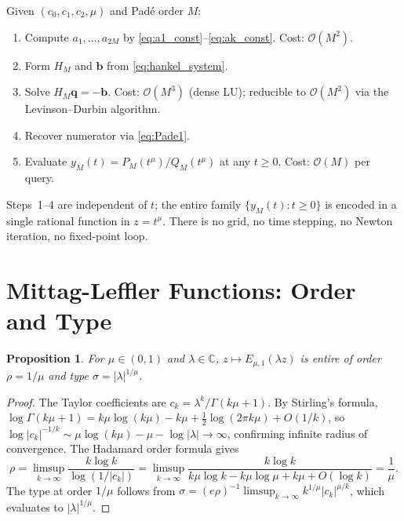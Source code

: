 \documentclass[12pt,a4paper]{amsart}
\newcommand{\ML}[2]{E_{#1,#2}}
\theoremstyle{plain}
\newtheorem{proposition}[theorem]{Proposition}
\theoremstyle{definition}
\theoremstyle{remark}
\begin{document}
Given $(c_0,c_1,c_2,\mu)$ and Pad\'e order $M$:
\begin{enumerate}
  \item Compute $a_1,\ldots,a_{2M}$ by \eqref{eq:a1_const}--\eqref{eq:ak_const}.
        Cost: $\mathcal{O}(M^2)$.
  \item Form $H_M$ and $\mathbf{b}$ from \eqref{eq:hankel_system}.
  \item Solve $H_M\mathbf{q}=-\mathbf{b}$.
        Cost: $\mathcal{O}(M^3)$ (dense LU); reducible to
        $\mathcal{O}(M^2)$ via the Levinson--Durbin algorithm.
  \item Recover numerator via \eqref{eq:Pade1}.
  \item Evaluate $y_M(t)=P_M(t^{\mu})/Q_M(t^{\mu})$ at any $t\ge 0$.
        Cost: $\mathcal{O}(M)$ per query.
\end{enumerate}
Steps~1--4 are independent of $t$; the entire family $\{y_M(t):t\ge 0\}$
is encoded in a single rational function in $z=t^{\mu}$.
There is no grid, no time stepping, no Newton iteration, no fixed-point loop.

\appendix

\section{Mittag-Leffler Functions: Order and Type}\label{app:ML}

\begin{proposition}\label{prop:ML_order}
For $\mu\in(0,1)$ and $\lambda\in\mathbb{C}$, $z\mapsto\ML{\mu}{1}(\lambda z)$
is entire of order $\rho=1/\mu$ and type $\sigma=|\lambda|^{1/\mu}$.
\end{proposition}

\begin{proof}
The Taylor coefficients are $c_k=\lambda^k/\Gamma(k\mu+1)$. By Stirling's
formula, $\log\Gamma(k\mu+1)=k\mu\log(k\mu)-k\mu+\tfrac{1}{2}\log(2\pi k\mu)+O(1/k)$,
so $\log|c_k|^{-1/k}\sim\mu\log(k\mu)-\mu-\log|\lambda|\to\infty$,
confirming infinite radius of convergence. The Hadamard order formula gives
\[
  \rho=\limsup_{k\to\infty}\frac{k\log k}{\log(1/|c_k|)}
  =\limsup_{k\to\infty}\frac{k\log k}{k\mu\log k-k\mu\log\mu+k\mu+O(\log k)}
  =\frac{1}{\mu}.
\]
The type at order $1/\mu$ follows from $\sigma=(e\rho)^{-1}\limsup_{k\to\infty}
k^{1/\mu}|c_k|^{\mu/k}$, which evaluates to $|\lambda|^{1/\mu}$.
\end{proof}
\end{document}
